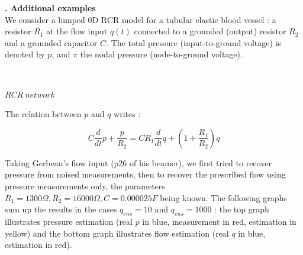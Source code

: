 \documentclass[a4paper]{article}
\newcounter{c}
\newcounter{d}
\newcounter{r}
\newcounter{e}
\newcommand{\chapitre}[1]{\stepcounter{c}\setcounter{e}{0}\setcounter{d}{0}\setcounter{r}{0}\noindent\textbf{\Large\arabic{c}. #1}\\}
\begin{document}
\newpage
\chapitre{Additional examples}

We consider a lumped 0D RCR model for a tubular elastic blood vessel : a resistor $R_1$ at the flow input $q(t)$ connected to a grounded (output) resistor $R_2$ and a grounded capacitor $C$. The total pressure (input-to-ground voltage) is denoted by $p$, and $\pi$ the nodal pressure (node-to-ground voltage).


\begin{center}


~


$RCR~network$
\end{center}

The relation between $p$ and $q$ writes :

$$C\frac d{dt}p+\frac p{R_2}=CR_1\frac d{dt}q+\left(1+\frac{R_1}{R_2}\right)q$$

Taking Gerbeau's flow input (p26 of his beamer), we first tried to recover pressure from noised measurements, then to recover the prescribed flow using pressure measurements only, the parameters $R_1=1300\Omega,R_2=16000\Omega,C=0.000025F$ being known. The following graphs sum up the results in the cases $q_{ens}=10$ and $q_{ens}=1000$ : the top graph illustrates pressure estimation (real $p$ in blue, measurement in red, estimation in yellow) and the bottom graph illustrates flow estimation (real $q$ in blue, estimation in red).
\end{document}
